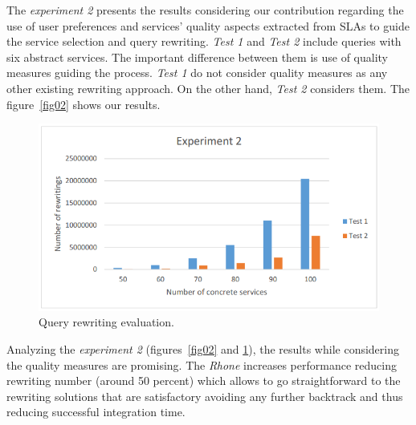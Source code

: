 The \textit{experiment 2} presents the results considering our contribution regarding the use of user preferences and services' quality aspects extracted from SLAs to guide the service selection and query rewriting.
\textit{Test 1} and \textit{Test 2} include queries with six abstract services. 
The important difference between them is use of quality measures guiding the process. \textit{Test 1} do not consider quality measures as any other existing rewriting approach. On the other hand, \textit{Test 2} considers them.
The figure~\ref{fig02} shows our results. 

\begin{figure}[!h]
\centering
\includegraphics[scale=0.4]{exp3.png}
\caption{Query rewriting evaluation.}\label{fig03}
\end{figure} 

Analyzing the \textit{experiment 2} (figures~\ref{fig02} and \ref{fig03}), the results while considering the quality measures are promising.  
The \textit{Rhone} increases performance reducing rewriting number (around 50 percent) which allows to go straightforward to the rewriting solutions that are satisfactory avoiding any further backtrack and thus reducing successful integration time.